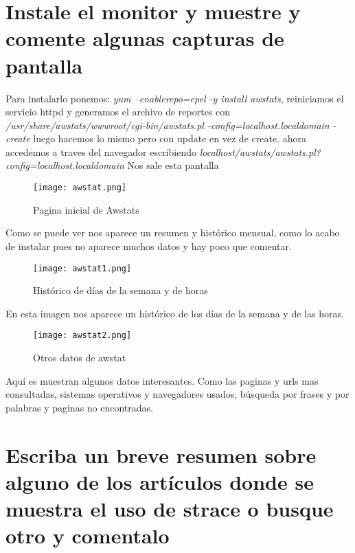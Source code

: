 \section{Instale el monitor y muestre y comente algunas capturas de pantalla}
Para instalarlo ponemos: \textit{yum --enablerepo=epel -y install awstats}, reiniciamos el servicio httpd y generamos el archivo de reportes con \textit{/usr/share/awstats/wwwroot/cgi-bin/awstats.pl -config=localhost.localdomain -create} luego hacemos lo mismo pero con update en vez de create.
ahora accedemos a traves del navegador escribiendo \textit{localhost/awstats/awstats.pl?config=localhost.localdomain}
Nos sale esta pantalla
\begin{figure}[H] 
\centering
\texttt{[image: awstat.png]}  
\label{figura23:}
\caption{Pagina inicial de Awstats}
\end{figure}
Como se puede ver nos aparece un resumen y histórico mensual, como lo acabo de instalar pues no aparece muchos datos y hay poco que comentar.
\begin{figure}[H] 
\centering
\texttt{[image: awstat1.png]}  
\label{figura23:}
\caption{Histórico de días de la semana y de horas}
\end{figure}
En esta imagen nos aparece un histórico de los días de la semana y de las horas.
\begin{figure}[H] 
\centering
\texttt{[image: awstat2.png]}  
\label{figura23:}
\caption{Otros datos de awstat}
\end{figure}
Aquí es muestran algunos datos interesantes. Como las paginas y urls mas consultadas, sistemas operativos y navegadores usados, búsqueda por frases y por palabras y paginas no encontradas.
\section{Escriba un breve resumen sobre alguno de los artículos donde se muestra el uso de strace o busque otro y comentalo}

